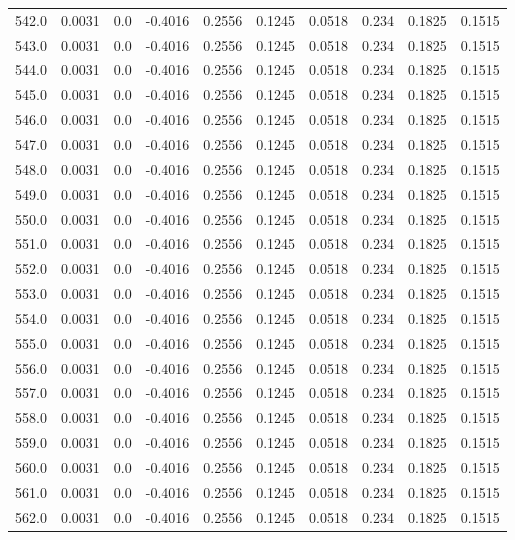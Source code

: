 \begin{longtable}{lrrrrrrrrr}
542.0 & 0.0031 & 0.0 & -0.4016 & 0.2556 & 0.1245 & 0.0518 & 0.234 & 0.1825 & 0.1515 \\
543.0 & 0.0031 & 0.0 & -0.4016 & 0.2556 & 0.1245 & 0.0518 & 0.234 & 0.1825 & 0.1515 \\
544.0 & 0.0031 & 0.0 & -0.4016 & 0.2556 & 0.1245 & 0.0518 & 0.234 & 0.1825 & 0.1515 \\
545.0 & 0.0031 & 0.0 & -0.4016 & 0.2556 & 0.1245 & 0.0518 & 0.234 & 0.1825 & 0.1515 \\
546.0 & 0.0031 & 0.0 & -0.4016 & 0.2556 & 0.1245 & 0.0518 & 0.234 & 0.1825 & 0.1515 \\
547.0 & 0.0031 & 0.0 & -0.4016 & 0.2556 & 0.1245 & 0.0518 & 0.234 & 0.1825 & 0.1515 \\
548.0 & 0.0031 & 0.0 & -0.4016 & 0.2556 & 0.1245 & 0.0518 & 0.234 & 0.1825 & 0.1515 \\
549.0 & 0.0031 & 0.0 & -0.4016 & 0.2556 & 0.1245 & 0.0518 & 0.234 & 0.1825 & 0.1515 \\
550.0 & 0.0031 & 0.0 & -0.4016 & 0.2556 & 0.1245 & 0.0518 & 0.234 & 0.1825 & 0.1515 \\
551.0 & 0.0031 & 0.0 & -0.4016 & 0.2556 & 0.1245 & 0.0518 & 0.234 & 0.1825 & 0.1515 \\
552.0 & 0.0031 & 0.0 & -0.4016 & 0.2556 & 0.1245 & 0.0518 & 0.234 & 0.1825 & 0.1515 \\
553.0 & 0.0031 & 0.0 & -0.4016 & 0.2556 & 0.1245 & 0.0518 & 0.234 & 0.1825 & 0.1515 \\
554.0 & 0.0031 & 0.0 & -0.4016 & 0.2556 & 0.1245 & 0.0518 & 0.234 & 0.1825 & 0.1515 \\
555.0 & 0.0031 & 0.0 & -0.4016 & 0.2556 & 0.1245 & 0.0518 & 0.234 & 0.1825 & 0.1515 \\
556.0 & 0.0031 & 0.0 & -0.4016 & 0.2556 & 0.1245 & 0.0518 & 0.234 & 0.1825 & 0.1515 \\
557.0 & 0.0031 & 0.0 & -0.4016 & 0.2556 & 0.1245 & 0.0518 & 0.234 & 0.1825 & 0.1515 \\
558.0 & 0.0031 & 0.0 & -0.4016 & 0.2556 & 0.1245 & 0.0518 & 0.234 & 0.1825 & 0.1515 \\
559.0 & 0.0031 & 0.0 & -0.4016 & 0.2556 & 0.1245 & 0.0518 & 0.234 & 0.1825 & 0.1515 \\
560.0 & 0.0031 & 0.0 & -0.4016 & 0.2556 & 0.1245 & 0.0518 & 0.234 & 0.1825 & 0.1515 \\
561.0 & 0.0031 & 0.0 & -0.4016 & 0.2556 & 0.1245 & 0.0518 & 0.234 & 0.1825 & 0.1515 \\
562.0 & 0.0031 & 0.0 & -0.4016 & 0.2556 & 0.1245 & 0.0518 & 0.234 & 0.1825 & 0.1515 \\

\end{longtable}
